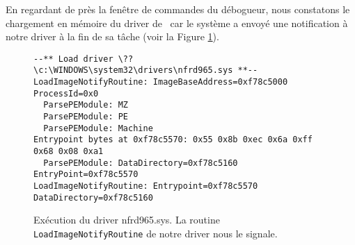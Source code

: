 En regardant de près la fenêtre de commandes du débogueur, nous constatons le chargement en mémoire du driver de \Duqu\ car le système a envoyé une notification à notre driver à la fin de sa tâche (voir la Figure \ref{fig:AThierry_LaunchNFRD965}). 
\begin{figure}
\scriptsize
% 
% 

\begin{changemargin}{-0.5cm}{-0.5cm}
\begin{lstlisting}[language={}]
--** Load driver \??\c:\WINDOWS\system32\drivers\nfrd965.sys **--
LoadImageNotifyRoutine: ImageBaseAddress=0xf78c5000 ProcessId=0x0 
  ParsePEModule: MZ
  ParsePEModule: PE
  ParsePEModule: Machine
Entrypoint bytes at 0xf78c5570: 0x55 0x8b 0xec 0x6a 0xff 0x68 0x08 0xa1
  ParsePEModule: DataDirectory=0xf78c5160 EntryPoint=0xf78c5570
LoadImageNotifyRoutine: Entrypoint=0xf78c5570 DataDirectory=0xf78c5160 
\end{lstlisting}
\end{changemargin}
\caption{Exécution du driver nfrd965.sys. La routine \texttt{LoadImageNotifyRoutine} de notre driver nous le signale.\label{fig:AThierry_LaunchNFRD965}}
\end{figure}

